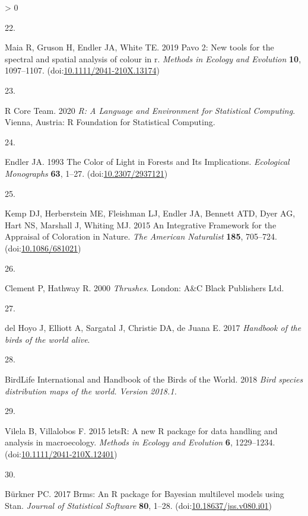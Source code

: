 \documentclass[
  a4paper,
]{article}
\newlength{\cslhangindent}
\newlength{\csllabelwidth}
\newenvironment{CSLReferences}[2] %
 {%
  \setlength{\parindent}{0pt}
  \ifodd #1 \everypar{\setlength{\hangindent}{\cslhangindent}}\ignorespaces\fi
  \ifnum #2 > 0
  \setlength{\parskip}{#2\baselineskip}
  \fi
 }%
 {}
\newcommand{\CSLLeftMargin}[1]{\parbox[t]{\csllabelwidth}{#1}}
\newcommand{\CSLRightInline}[1]{\parbox[t]{\linewidth - \csllabelwidth}{#1}\break}
\begin{document}
\begin{CSLReferences}{0}{0}
\leavevmode\hypertarget{ref-maia2019}{}%
\CSLLeftMargin{22. }
\CSLRightInline{Maia R, Gruson H, Endler JA, White TE. 2019 Pavo 2:
{New} tools for the spectral and spatial analysis of colour in r.
\emph{Methods in Ecology and Evolution} \textbf{10}, 1097--1107.
(doi:\href{https://doi.org/10.1111/2041-210X.13174}{10.1111/2041-210X.13174})}

\leavevmode\hypertarget{ref-rcoreteam2020}{}%
\CSLLeftMargin{23. }
\CSLRightInline{R Core Team. 2020 \emph{R: {A Language} and
{Environment} for {Statistical Computing}}. {Vienna, Austria}: {R
Foundation for Statistical Computing}. }

\leavevmode\hypertarget{ref-endler1993}{}%
\CSLLeftMargin{24. }
\CSLRightInline{Endler JA. 1993 The {Color} of {Light} in {Forests} and
{Its Implications}. \emph{Ecological Monographs} \textbf{63}, 1--27.
(doi:\href{https://doi.org/10.2307/2937121}{10.2307/2937121})}

\leavevmode\hypertarget{ref-kemp2015}{}%
\CSLLeftMargin{25. }
\CSLRightInline{Kemp DJ, Herberstein ME, Fleishman LJ, Endler JA,
Bennett ATD, Dyer AG, Hart NS, Marshall J, Whiting MJ. 2015 An
{Integrative Framework} for the {Appraisal} of {Coloration} in {Nature}.
\emph{The American Naturalist} \textbf{185}, 705--724.
(doi:\href{https://doi.org/10.1086/681021}{10.1086/681021})}

\leavevmode\hypertarget{ref-clement2000}{}%
\CSLLeftMargin{26. }
\CSLRightInline{Clement P, Hathway R. 2000 \emph{Thrushes}. {London}:
{A\&C Black Publishers Ltd}. }

\leavevmode\hypertarget{ref-delhoyo2017}{}%
\CSLLeftMargin{27. }
\CSLRightInline{del Hoyo J, Elliott A, Sargatal J, Christie DA, de Juana
E. 2017 \emph{Handbook of the birds of the world alive}. }

\leavevmode\hypertarget{ref-birdlifeinternationalandhandbookofthebirdsoftheworld2018}{}%
\CSLLeftMargin{28. }
\CSLRightInline{BirdLife International and Handbook of the Birds of the
World. 2018 \emph{Bird species distribution maps of the world. {Version}
2018.1.} }

\leavevmode\hypertarget{ref-vilela2015}{}%
\CSLLeftMargin{29. }
\CSLRightInline{Vilela B, Villalobos F. 2015 {letsR}: A new {R} package
for data handling and analysis in macroecology. \emph{Methods in Ecology
and Evolution} \textbf{6}, 1229--1234.
(doi:\href{https://doi.org/10.1111/2041-210X.12401}{10.1111/2041-210X.12401})}

\leavevmode\hypertarget{ref-burkner2017}{}%
\CSLLeftMargin{30. }
\CSLRightInline{Bürkner PC. 2017 Brms: {An R} package for {Bayesian}
multilevel models using {Stan}. \emph{Journal of Statistical Software}
\textbf{80}, 1--28.
(doi:\href{https://doi.org/10.18637/jss.v080.i01}{10.18637/jss.v080.i01})}


\end{CSLReferences}
\end{document}

